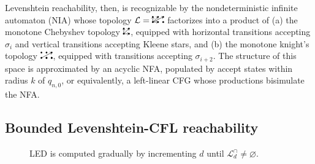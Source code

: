 \documentclass[sigplan,review,anonymous,acmsmall]{acmart}\settopmatter{printfolios=false,printccs=false,printacmref=false}
\begin{document}
Levenshtein reachability, then, is recognizable by the nondeterministic infinite automaton (NIA) whose topology $\mathcal{L} = \knightkingarrow$ factorizes into a product of (a) the monotone Chebyshev topology $\kingarrow$, equipped with horizontal transitions accepting $\sigma_{i}$ and vertical transitions accepting Kleene stars, and (b) the monotone knight's topology $\knightarrow$, equipped with transitions accepting $\sigma_{i+2}$. The structure of this space is approximated by an acyclic NFA, populated by accept states within radius $k$ of $q_{n,0}$, or equivalently, a left-linear CFG whose productions bisimulate the NFA.

\subsection{Bounded Levenshtein-CFL reachability}\label{sec:editreach}


\begin{figure}
  \vspace{-10pt}
  \resizebox{0.33\textwidth}{!}{}
  \caption{LED is computed gradually by incrementing $d$ until $\mathcal{L}^\cap_{d}\neq \varnothing$.}
\end{figure}
\end{document}
